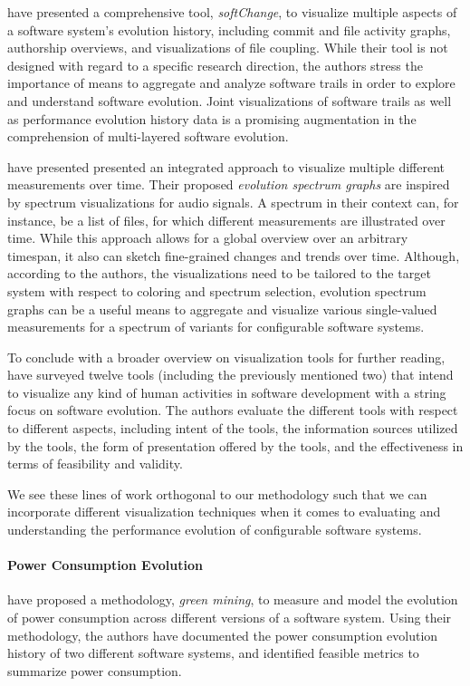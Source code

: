 \cite{german_visualizing_2006} have presented a comprehensive tool,
\emph{softChange}, to visualize multiple aspects of a software system’s
evolution history, including commit and file activity graphs, authorship
overviews, and visualizations of file coupling. While their tool is not
designed with regard to a specific research direction, the authors stress the
importance of means to aggregate and analyze software trails in order to
explore and understand software evolution. Joint visualizations
of software trails as well as performance evolution history data is a promising
augmentation in the comprehension of multi-layered software evolution.

\cite{wu_exploring_2004} have presented presented an integrated approach to
visualize multiple different measurements over time. Their proposed
\emph{evolution spectrum graphs} are inspired by spectrum visualizations for
audio signals. A spectrum in their context can, for instance,  be a list of files, for which
different measurements are illustrated over time. While this approach allows
for a global overview over an arbitrary timespan, it also can sketch
fine-grained changes and trends over time. Although, according to the authors, the
visualizations need to be tailored to the target system with respect to
coloring and spectrum selection, evolution spectrum graphs can be a useful
means to aggregate and visualize various single-valued measurements for a
spectrum of variants for configurable software systems.

To conclude with a broader overview on visualization tools for further reading,
\cite{storey_use_2005} have surveyed twelve tools (including the previously
mentioned two) that intend to visualize any kind of human activities in
software development with a string focus on software evolution. The authors
evaluate the different tools with respect to different aspects, including
intent of the tools, the information sources utilized by the tools, the form of
presentation offered by the tools, and the effectiveness in terms of
feasibility and validity.

We see these lines of work orthogonal to our methodology such that we can
incorporate different visualization techniques when it comes to evaluating and
understanding the performance evolution of configurable software systems.

\paragraph{Power Consumption Evolution}
\cite{hindle_green_2015} have proposed a methodology, \emph{green mining}, to
measure and model the evolution of power consumption across different versions of a
software system. Using their methodology, the authors have documented the power
consumption evolution history of two different software systems, and identified
feasible metrics to summarize power consumption. 

